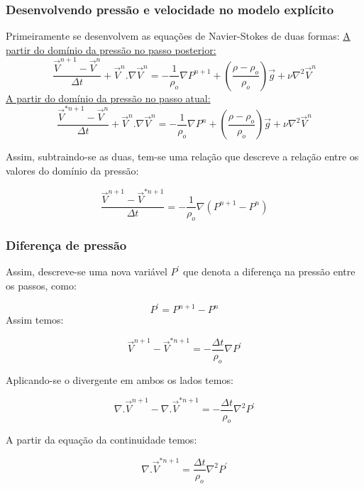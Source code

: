 \documentclass[xcolor=dvipsnames,10pt,aspectratio=169]{beamer}
\begin{document}
	\begin{frame}
		\frametitle{Desenvolvendo pressão e velocidade no modelo explícito}
		\flushleft
		Primeiramente se desenvolvem as equações de Navier-Stokes de duas formas:\vspace{0.5cm}
		\centering
		\underline{A partir do domínio da pressão no passo posterior:}
		\begin{equation}\label{equation1}
		\frac{\vec{V}^{n + 1} - \vec{V}^{n}}{\Delta t} + \vec{V}^{n} . {\nabla} \vec{V}^{n} = - \frac{1}{\rho_o}\nabla P^{n + 1} + \left( \frac{\rho - \rho_o}{\rho_o} \right) \vec{g} + \nu \nabla^2 \vec{V}^{n}
		\end{equation}
		\underline{A partir do domínio da pressão no passo atual:}
		\begin{equation}\label{eqlabel1}
		\frac{\vec{V}^{\ast{n + 1}} - \vec{V}^{n}}{\Delta t} + \vec{V}^{n} . {\nabla} \vec{V}^{n} = - \frac{1}{\rho_o}\nabla P^{n} + \left( \frac{\rho - \rho_o}{\rho_o} \right) \vec{g} + \nu \nabla^2 \vec{V}^{n}
		\end{equation}

		Assim, subtraindo-se as duas, tem-se uma relação que descreve a relação entre os valores do domínio da pressão:

		\begin{equation}
		\frac{\vec{V}^{{n + 1}} - \vec{V}^{{\ast n+1} }}{\Delta t} = - \frac{1}{\rho_o}\nabla \left( P^{n+1} - P ^n\right)
		\end{equation}



	\end{frame}




	\begin{frame}
		\frametitle{Diferença de pressão}
		\flushleft
		Assim, descreve-se uma nova variável $ P^\prime $ que denota a diferença na pressão entre os passos, como:

		\begin{equation}
		P^\prime = P^{n + 1} - P^n
		\end{equation}
		Assim temos:

		\begin{equation}\label{eqlabel3}
		\vec{V}^{n+1} - \vec{V}^{\ast{n + 1}} = - \frac{\Delta t}{\rho_o} \nabla P^\prime
		\end{equation}

		Aplicando-se o divergente em ambos os lados temos:

		\begin{equation}
		\nabla . \vec{V}^{n+1} - \nabla .\vec{V}^{\ast{n + 1}} = - \frac{\Delta t}{\rho_o} \nabla^2 P^\prime
		\end{equation}

		A partir da equação da continuidade temos:

		\begin{equation}\label{eqlabel2}
		\nabla .\vec{V}^{\ast{n + 1}} = \frac{\Delta t}{\rho_o} \nabla^2 P^\prime
		\end{equation}


	\end{frame}
\end{document}
